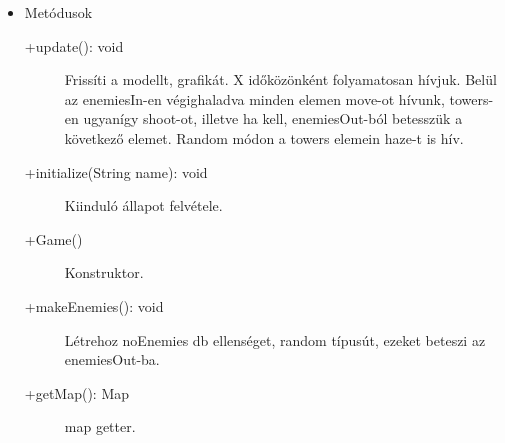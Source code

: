 \begin{itemize}
\begin{description}
		
	\end{description}
\item Metódusok
	\begin{description}
		\item[+update(): void] Frissíti a modellt, grafikát. X időközönként folyamatosan hívjuk. Belül az enemiesIn-en végighaladva minden elemen move-ot hívunk, towers-en ugyanígy shoot-ot, illetve ha kell, enemiesOut-ból betesszük a következő elemet. Random módon a towers elemein haze-t is hív. 
\item[+initialize(String name): void] Kiinduló állapot felvétele. 
\item[+Game()] Konstruktor. 
\item[+makeEnemies(): void] Létrehoz noEnemies db ellenséget, random típusút, ezeket beteszi az enemiesOut-ba. 
\item[+getMap(): Map] map getter.

		
		
	\end{description}
\end{itemize}

